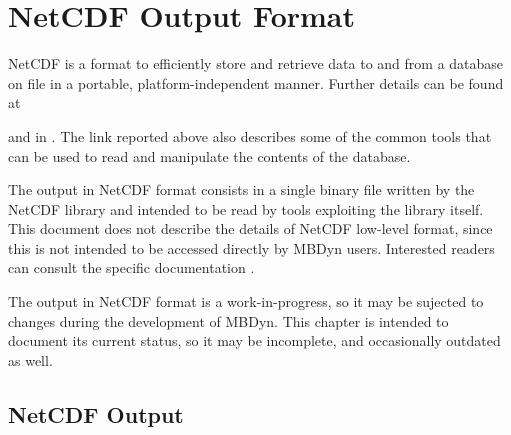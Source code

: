%
%
%
%
%
% 
%
%

\chapter{NetCDF Output Format}
\label{sec:NETCDF}
NetCDF is a format to efficiently store and retrieve data to and from
a database on file in a portable, platform-independent manner.
Further details can be found at
\begin{quote}
\end{quote}
and in \cite{NETCDF-UM}.
The link reported above also describes some of the common tools
that can be used to read and manipulate the contents of the database.

The output in NetCDF format consists in a single binary file
written by the NetCDF library and intended to be read by tools
exploiting the library itself.
This document does not describe the details of NetCDF low-level format,
since this is not intended to be accessed directly by MBDyn users.
Interested readers can consult the specific documentation \cite{NETCDF-UM}.

The output in NetCDF format is a work-in-progress, so it may be sujected
to changes during the development of MBDyn.
This chapter is intended to document its current status,
so it may be incomplete, and occasionally outdated as well.



\section{NetCDF Output}

